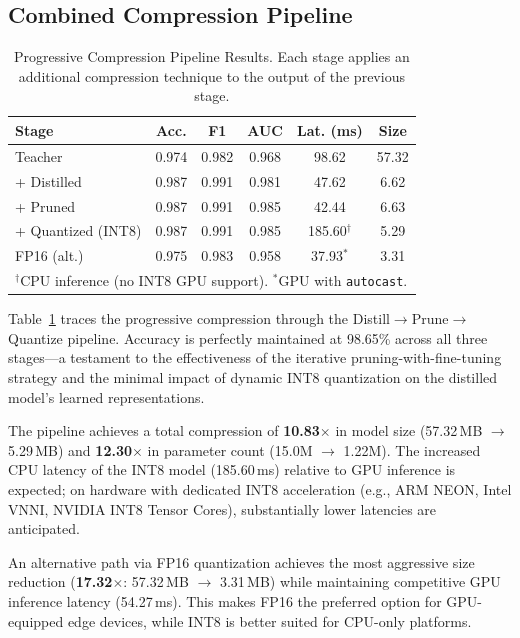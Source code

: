 \documentclass[lettersize,journal]{IEEEtran}
\begin{document}
\subsection{Combined Compression Pipeline}

\begin{table}[!t]
\caption{Progressive Compression Pipeline Results. Each stage applies an additional compression technique to the output of the previous stage.\label{tab:pipeline}}
\centering
\footnotesize
\begin{tabular}{lccccc}
\toprule
\textbf{Stage} & \textbf{Acc.} & \textbf{F1} & \textbf{AUC} & \textbf{Lat. (ms)} & \textbf{Size} \\
\midrule
Teacher & 0.974 & 0.982 & 0.968 & 98.62 & 57.32 \\
\midrule
+ Distilled & 0.987 & 0.991 & 0.981 & 47.62 & 6.62 \\
+ Pruned & 0.987 & 0.991 & 0.985 & 42.44 & 6.63 \\
+ Quantized (INT8) & 0.987 & 0.991 & 0.985 & 185.60$^\dagger$ & 5.29 \\
\midrule
FP16 (alt.) & 0.975 & 0.983 & 0.958 & 37.93$^*$ & 3.31 \\
\bottomrule
\multicolumn{6}{l}{\footnotesize $^\dagger$CPU inference (no INT8 GPU support). $^*$GPU with \texttt{autocast}.}
\end{tabular}
\end{table}

Table~\ref{tab:pipeline} traces the progressive compression through the Distill$\rightarrow$Prune$\rightarrow$Quantize pipeline. Accuracy is perfectly maintained at 98.65\% across all three stages---a testament to the effectiveness of the iterative pruning-with-fine-tuning strategy and the minimal impact of dynamic INT8 quantization on the distilled model's learned representations.

The pipeline achieves a total compression of \textbf{10.83$\times$} in model size (57.32\,MB $\rightarrow$ 5.29\,MB) and \textbf{12.30$\times$} in parameter count (15.0M $\rightarrow$ 1.22M). The increased CPU latency of the INT8 model (185.60\,ms) relative to GPU inference is expected; on hardware with dedicated INT8 acceleration (e.g., ARM NEON, Intel VNNI, NVIDIA INT8 Tensor Cores), substantially lower latencies are anticipated.

An alternative path via FP16 quantization achieves the most aggressive size reduction (\textbf{17.32$\times$}: 57.32\,MB $\rightarrow$ 3.31\,MB) while maintaining competitive GPU inference latency (54.27\,ms). This makes FP16 the preferred option for GPU-equipped edge devices, while INT8 is better suited for CPU-only platforms.
\end{document}
